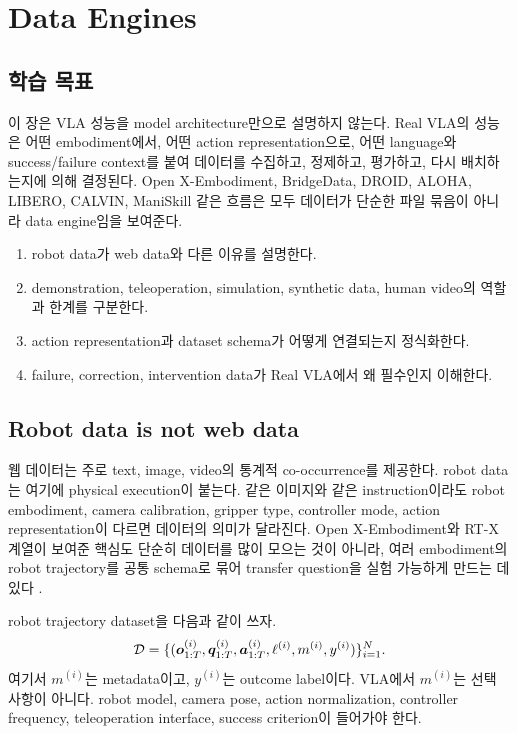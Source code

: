 \chapter{Data Engines}

\section*{학습 목표}

이 장은 VLA 성능을 model architecture만으로 설명하지 않는다. Real VLA의 성능은 어떤 embodiment에서, 어떤 action representation으로, 어떤 language와 success/failure context를 붙여 데이터를 수집하고, 정제하고, 평가하고, 다시 배치하는지에 의해 결정된다. Open X-Embodiment, BridgeData, DROID, ALOHA, LIBERO, CALVIN, ManiSkill 같은 흐름은 모두 데이터가 단순한 파일 묶음이 아니라 data engine임을 보여준다.

\begin{enumerate}
  \item robot data가 web data와 다른 이유를 설명한다.
  \item demonstration, teleoperation, simulation, synthetic data, human video의 역할과 한계를 구분한다.
  \item action representation과 dataset schema가 어떻게 연결되는지 정식화한다.
  \item failure, correction, intervention data가 Real VLA에서 왜 필수인지 이해한다.
\end{enumerate}

\section{Robot data is not web data}

웹 데이터는 주로 text, image, video의 통계적 co-occurrence를 제공한다. robot data는 여기에 physical execution이 붙는다. 같은 이미지와 같은 instruction이라도 robot embodiment, camera calibration, gripper type, controller mode, action representation이 다르면 데이터의 의미가 달라진다. Open X-Embodiment와 RT-X 계열이 보여준 핵심도 단순히 데이터를 많이 모으는 것이 아니라, 여러 embodiment의 robot trajectory를 공통 schema로 묶어 transfer question을 실험 가능하게 만드는 데 있다 \cite{openx2023}.

robot trajectory dataset을 다음과 같이 쓰자.
\begin{equation}
  \mathcal{D}
  =
  \{
  (\bm{o}_{1:T}^{(i)},\bm{q}_{1:T}^{(i)},\bm{a}_{1:T}^{(i)},\ell^{(i)},m^{(i)},y^{(i)})
  \}_{i=1}^{N}.
  \label{eq:ch14-dataset}
\end{equation}
여기서 $m^{(i)}$는 metadata이고, $y^{(i)}$는 outcome label이다. VLA에서 $m^{(i)}$는 선택 사항이 아니다. robot model, camera pose, action normalization, controller frequency, teleoperation interface, success criterion이 들어가야 한다.

